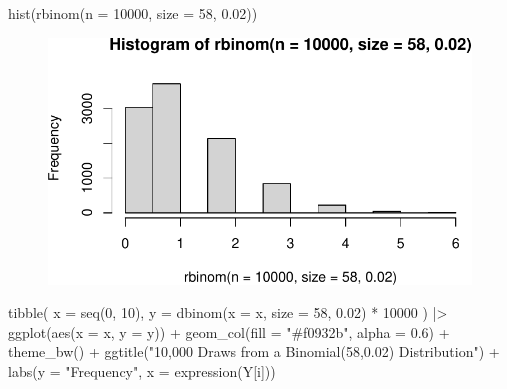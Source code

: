 \documentclass[
  letterpaper,
  DIV=11,
  numbers=noendperiod]{scrreport}
\newenvironment{Shaded}{\begin{snugshade}}{\end{snugshade}}
\newcommand{\AttributeTok}[1]{\textcolor[rgb]{0.40,0.45,0.13}{#1}}
\newcommand{\DecValTok}[1]{\textcolor[rgb]{0.68,0.00,0.00}{#1}}
\newcommand{\FloatTok}[1]{\textcolor[rgb]{0.68,0.00,0.00}{#1}}
\newcommand{\FunctionTok}[1]{\textcolor[rgb]{0.28,0.35,0.67}{#1}}
\newcommand{\NormalTok}[1]{\textcolor[rgb]{0.00,0.23,0.31}{#1}}
\newcommand{\SpecialCharTok}[1]{\textcolor[rgb]{0.37,0.37,0.37}{#1}}
\newcommand{\StringTok}[1]{\textcolor[rgb]{0.13,0.47,0.30}{#1}}
\begin{document}
\begin{Shaded}
\begin{Highlighting}[]
\FunctionTok{hist}\NormalTok{(}\FunctionTok{rbinom}\NormalTok{(}\AttributeTok{n =} \DecValTok{10000}\NormalTok{, }\AttributeTok{size =} \DecValTok{58}\NormalTok{, }\FloatTok{0.02}\NormalTok{))}
\end{Highlighting}
\end{Shaded}

\begin{figure}[H]

{\centering \includegraphics[width=1\textwidth,height=\textheight]{week8/week8_files/figure-pdf/unnamed-chunk-4-1.pdf}

}

\end{figure}

\begin{Shaded}
\begin{Highlighting}[]
\FunctionTok{tibble}\NormalTok{(}
  \AttributeTok{x =} \FunctionTok{seq}\NormalTok{(}\DecValTok{0}\NormalTok{, }\DecValTok{10}\NormalTok{),}
  \AttributeTok{y =} \FunctionTok{dbinom}\NormalTok{(}\AttributeTok{x =}\NormalTok{ x, }\AttributeTok{size =} \DecValTok{58}\NormalTok{, }\FloatTok{0.02}\NormalTok{) }\SpecialCharTok{*} \DecValTok{10000}
\NormalTok{) }\SpecialCharTok{|\textgreater{}} 
\FunctionTok{ggplot}\NormalTok{(}\FunctionTok{aes}\NormalTok{(}\AttributeTok{x =}\NormalTok{ x, }\AttributeTok{y =}\NormalTok{ y)) }\SpecialCharTok{+} 
\FunctionTok{geom\_col}\NormalTok{(}\AttributeTok{fill =} \StringTok{"\#f0932b"}\NormalTok{, }\AttributeTok{alpha =} \FloatTok{0.6}\NormalTok{) }\SpecialCharTok{+} 
\FunctionTok{theme\_bw}\NormalTok{() }\SpecialCharTok{+} 
\FunctionTok{ggtitle}\NormalTok{(}\StringTok{"10,000 Draws from a Binomial(58,0.02) Distribution"}\NormalTok{) }\SpecialCharTok{+} 
\FunctionTok{labs}\NormalTok{(}\AttributeTok{y =} \StringTok{"Frequency"}\NormalTok{, }\AttributeTok{x =} \FunctionTok{expression}\NormalTok{(Y[i]))}
\end{Highlighting}
\end{Shaded}
\end{document}

